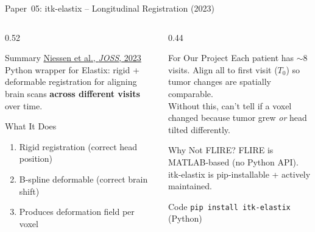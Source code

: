\documentclass[aspectratio=169,xcolor=dvipsnames]{beamer}
\begin{document}
\begin{frame}{Paper~05: itk-elastix -- Longitudinal Registration (2023)}
    \begin{columns}
        \begin{column}{0.52\textwidth}
            \begin{block}{Summary}
                \small
                \href{https://doi.org/10.21105/joss.05421}{Niessen et al., \textit{JOSS}, 2023}\\[0.3em]
                Python wrapper for Elastix: rigid + deformable registration for aligning brain scans \textbf{across different visits} over time.
            \end{block}

            \vspace{0.2em}

            \begin{block}{What It Does}
                \small
                \begin{enumerate}
                    \item Rigid registration (correct head position)
                    \item B-spline deformable (correct brain shift)
                    \item Produces deformation field per voxel
                \end{enumerate}
            \end{block}
        \end{column}

        \begin{column}{0.44\textwidth}
            \begin{alertblock}{For Our Project}
                \small
                Each patient has $\sim$8 visits. Align all to first visit ($T_0$) so tumor changes are spatially comparable.\\[0.3em]
                Without this, can't tell if a voxel changed because tumor grew \textit{or} head tilted differently.
            \end{alertblock}

            \vspace{0.2em}

            \begin{block}{\small Why Not FLIRE?}
                \scriptsize
                FLIRE is MATLAB-based (no Python API).\\
                itk-elastix is pip-installable + actively maintained.
            \end{block}

            \begin{exampleblock}{\scriptsize {} Code}
                \scriptsize \texttt{pip install itk-elastix} (Python)
            \end{exampleblock}
        \end{column}
    \end{columns}
\end{frame}
\end{document}
